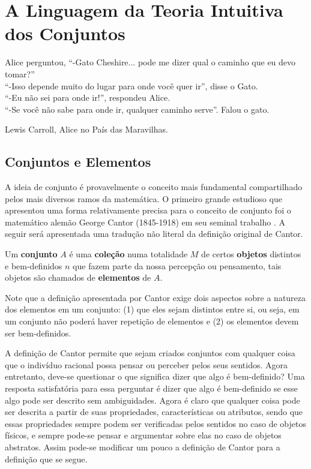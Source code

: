 \chapter{A Linguagem da Teoria Intuitiva dos Conjuntos}\label{cap:Conjuntos}

\epigraph{Alice perguntou, ``-Gato Cheshire... pode me dizer qual o caminho que eu devo tomar?''\\ ``-Isso depende muito do lugar para onde você quer ir'', disse o Gato.\\ ``-Eu não sei para onde ir!'', respondeu Alice.\\ ``-Se você não sabe para onde ir, qualquer caminho serve''. Falou o gato.}{Lewis Carroll, Alice no País das Maravilhas.}

\section{Conjuntos e Elementos}

A ideia de conjunto é provavelmente o conceito mais fundamental compartilhado pelos mais diversos ramos da matemática. O primeiro grande estudioso que apresentou uma forma relativamente precisa para o conceito de conjunto foi o matemático alemão George Cantor (1845-1918) em seu seminal trabalho \cite{cantor1895}. A seguir será apresentada uma tradução não literal da definição original de Cantor.

\begin{definition}[Cantor]\label{def:ConjuntoCantor}
	\cite{cantor1895} Um \textbf{conjunto} $A$ é uma \textbf{coleção} numa totalidade $M$ de certos \textbf{objetos} distintos e bem-definidos $n$ que fazem parte da nossa percepção ou pensamento, tais objetos são chamados de \textbf{elementos} de $A$.
\end{definition}

Note que a definição apresentada por Cantor exige dois aspectos sobre a natureza dos elementos em um conjunto: (1) que eles sejam distintos entre si, ou seja, em um conjunto não poderá haver repetição de elementos e (2) os elementos devem ser bem-definidos. 

A definição de Cantor permite que sejam criados conjuntos com qualquer coisa que o indivíduo racional possa pensar ou perceber pelos seus sentidos. Agora entretanto, deve-se questionar o que significa dizer que algo é bem-definido? Uma resposta satisfatória para essa perguntar é dizer que algo é bem-definido se esse algo pode ser descrito sem ambiguidades. Agora é claro que qualquer coisa pode ser descrita a partir de suas propriedades, características ou atributos, sendo que essas propriedades sempre podem ser verificadas pelos sentidos no caso de objetos físicos, e sempre pode-se pensar e argumentar sobre elas no caso de objetos abstratos. Assim pode-se modificar um pouco a definição de Cantor para a definição que se segue.

